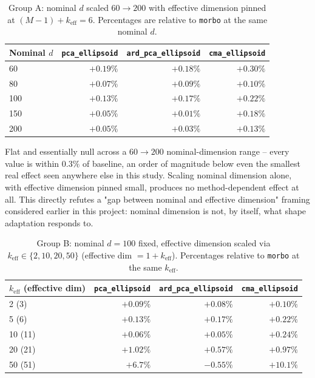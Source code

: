 \documentclass[11pt]{article}
\begin{document}
\begin{table}[h]
\centering
\caption{Group A: nominal $d$ scaled $60 \to 200$ with effective dimension
pinned at $(M{-}1)+k_{\mathrm{eff}} = 6$. Percentages are relative to
\texttt{morbo} at the same nominal $d$.}
\label{tab:sparse-dtlz2-groupA}
\begin{tabular}{lrrr}
\toprule
Nominal $d$ & \texttt{pca\_ellipsoid} & \texttt{ard\_pca\_ellipsoid} & \texttt{cma\_ellipsoid} \\
\midrule
60  & $+0.19\%$ & $+0.18\%$ & $+0.30\%$ \\
80  & $+0.07\%$ & $+0.09\%$ & $+0.10\%$ \\
100 & $+0.13\%$ & $+0.17\%$ & $+0.22\%$ \\
150 & $+0.05\%$ & $+0.01\%$ & $+0.18\%$ \\
200 & $+0.05\%$ & $+0.03\%$ & $+0.13\%$ \\
\bottomrule
\end{tabular}
\end{table}

Flat and essentially null across a $60 \to 200$ nominal-dimension range --
every value is within $0.3\%$ of baseline, an order of magnitude below
even the smallest real effect seen anywhere else in this study. Scaling
nominal dimension alone, with effective dimension pinned small, produces
no method-dependent effect at all. This directly refutes a "gap between
nominal and effective dimension" framing considered earlier in this
project: nominal dimension is not, by itself, what shape adaptation
responds to.

\begin{table}[h]
\centering
\caption{Group B: nominal $d{=}100$ fixed, effective dimension scaled via
$k_{\mathrm{eff}} \in \{2,10,20,50\}$ (effective dim $= 1+k_{\mathrm{eff}}$).
Percentages relative to \texttt{morbo} at the same $k_{\mathrm{eff}}$.}
\label{tab:sparse-dtlz2-groupB}
\begin{tabular}{lrrr}
\toprule
$k_{\mathrm{eff}}$ (effective dim) & \texttt{pca\_ellipsoid} & \texttt{ard\_pca\_ellipsoid} & \texttt{cma\_ellipsoid} \\
\midrule
2 (3)   & $+0.09\%$ & $+0.08\%$ & $+0.10\%$ \\
5 (6)   & $+0.13\%$ & $+0.17\%$ & $+0.22\%$ \\
10 (11) & $+0.06\%$ & $+0.05\%$ & $+0.24\%$ \\
20 (21) & $+1.02\%$ & $+0.57\%$ & $+0.97\%$ \\
50 (51) & $\mathbf{+6.7\%}$ & $-0.55\%$ & $\mathbf{+10.1\%}$ \\
\bottomrule
\end{tabular}
\end{table}
\end{document}
